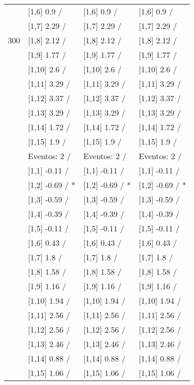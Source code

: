 \begin{table}
\begin{tabular}[t]{llll}
 & {}[1,6] 0.9  / & {}[1,6] 0.9  / & {}[1,6] 0.9  /\\
 & {}[1,7] 2.29  / & {}[1,7] 2.29  / & {}[1,7] 2.29  /\\
300 & {}[1,8] 2.12  / & {}[1,8] 2.12  / & {}[1,8] 2.12  /\\
\addlinespace
 & {}[1,9] 1.77  / & {}[1,9] 1.77  / & {}[1,9] 1.77  /\\
 & {}[1,10] 2.6  / & {}[1,10] 2.6  / & {}[1,10] 2.6  /\\
 & {}[1,11] 3.29  / & {}[1,11] 3.29  / & {}[1,11] 3.29  /\\
 & {}[1,12] 3.37  / & {}[1,12] 3.37  / & {}[1,12] 3.37  /\\
 & {}[1,13] 3.29  / & {}[1,13] 3.29  / & {}[1,13] 3.29  /\\
\addlinespace
 & {}[1,14] 1.72  / & {}[1,14] 1.72  / & {}[1,14] 1.72  /\\
 & {}[1,15] 1.9  / & {}[1,15] 1.9  / & {}[1,15] 1.9  /\\
 & Eventos:  2 / & Eventos:  2 / & Eventos:  2 /\\
 & {}[1,1] -0.11  / & {}[1,1] -0.11  / & {}[1,1] -0.11  /\\
 & {}[1,2] -0.69  / * & {}[1,2] -0.69  / * & {}[1,2] -0.69  / *\\
\addlinespace
 & {}[1,3] -0.59  / & {}[1,3] -0.59  / & {}[1,3] -0.59  /\\
 & {}[1,4] -0.39  / & {}[1,4] -0.39  / & {}[1,4] -0.39  /\\
 & {}[1,5] -0.11  / & {}[1,5] -0.11  / & {}[1,5] -0.11  /\\
 & {}[1,6] 0.43  / & {}[1,6] 0.43  / & {}[1,6] 0.43  /\\
 & {}[1,7] 1.8  / & {}[1,7] 1.8  / & {}[1,7] 1.8  /\\
\addlinespace
500 & {}[1,8] 1.58  / & {}[1,8] 1.58  / & {}[1,8] 1.58  /\\
 & {}[1,9] 1.16  / & {}[1,9] 1.16  / & {}[1,9] 1.16  /\\
 & {}[1,10] 1.94  / & {}[1,10] 1.94  / & {}[1,10] 1.94  /\\
 & {}[1,11] 2.56  / & {}[1,11] 2.56  / & {}[1,11] 2.56  /\\
 & {}[1,12] 2.56  / & {}[1,12] 2.56  / & {}[1,12] 2.56  /\\
\addlinespace
 & {}[1,13] 2.46  / & {}[1,13] 2.46  / & {}[1,13] 2.46  /\\
 & {}[1,14] 0.88  / & {}[1,14] 0.88  / & {}[1,14] 0.88  /\\
 & {}[1,15] 1.06  / & {}[1,15] 1.06  / & {}[1,15] 1.06  /\\
\bottomrule
\end{tabular}
\end{table}

